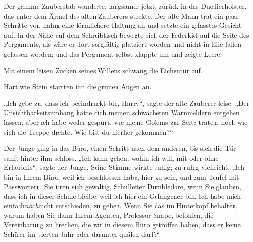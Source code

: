 {Der grimme Zauberstab wanderte, langsamer jetzt, zurück in das Duellierholster, das unter dem Ärmel des alten Zauberers steckte. Der alte Mann trat ein paar Schritte vor, nahm eine förmlichere Haltung an und setzte ein gefasstes Gesicht auf. In der Nähe auf dem Schreibtisch bewegte sich der Federkiel auf die Seite des Pergaments, als wäre er dort sorgfältig platziert worden und nicht in Eile fallen gelassen worden; und das Pergament selbst klappte um und zeigte Leere.

Mit einem leisen Zucken seines Willens schwang die Eichentür auf.

Hart wie Stein starrten ihn die grünen Augen an.

„Ich gebe zu, dass ich beeindruckt bin, Harry“, sagte der alte Zauberer leise. „Der Unsichtbarkeitsumhang hätte dich meinen schwächeren Warnmeldern entgehen lassen; aber ich habe weder gespürt, wie meine Golems zur Seite traten, noch wie sich die Treppe drehte. Wie bist du hierher gekommen?“

Der Junge ging in das Büro, einen Schritt nach dem anderen, bis sich die Tür sanft hinter ihm schloss. „Ich kann gehen, wohin ich will, mit oder ohne Erlaubnis“, sagte der Junge. Seine Stimme wirkte ruhig; zu ruhig vielleicht. „Ich bin in Ihrem Büro, weil ich beschlossen habe, hier zu sein, und zum Teufel mit Passwörtern. Sie irren sich gewaltig, Schulleiter Dumbledore, wenn Sie glauben, dass ich in dieser Schule bleibe, weil ich hier ein Gefangener bin. Ich habe mich einfach\emph{noch}nicht entschieden, zu gehen. Wenn Sie das im Hinterkopf behalten, warum haben Sie dann Ihrem Agenten, Professor Snape, befohlen, die Vereinbarung zu brechen, die wir in diesem Büro getroffen haben, dass er keine Schüler im vierten Jahr oder darunter quälen darf?“

}
